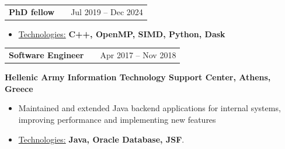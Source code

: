 \documentclass[a4paper,10pt]{article}
\makeatletter
\newenvironment{job}[2]
{
	\begin{tabularx}{\linewidth}{@{}l X r@{}}
		\small
		\textbf{#1} & \hfill &  #2 \\[3.75pt]
	\end{tabularx}
	\footnotesize
	\setlength{\parskip}{3pt} %
	\setlength{\parindent}{0pt} %
}
{
}
\makeatother
\begin{document}
\begin{job}{PhD fellow}{Jul 2019 – Dec 2024}
\begin{itemize}
\begin{itemize}
			\item \href{https://www.more2020.eu/}{MORE}: Management of Real-time Energy data. 
				
			\begin{itemize}
				\item Built parallel continuous evaluation module in Java for sliding-window aggregations, enabling low-latency energy analytics
				\item Implemented parallel versions of time-series analytics algorithms in Python using Dask to improve efficiency and scalability for large-scale data processing
			
			
			
			\end{itemize}
		\end{itemize}
		
		\vspace{-1\baselineskip}
		
		\item \underline{Technologies:} \textbf{C++, OpenMP, SIMD, Python, Dask}
		
	\end{itemize}
\end{job}

\vspace{-0.6\baselineskip}
\begin{job}{Software Engineer}{Apr 2017 – Nov 2018}
	\textbf{Hellenic Army Information Technology Support Center, Athens, Greece} 
	
	\begin{itemize}
		
		
		\item Maintained and extended Java backend applications for internal systems, improving performance and implementing new features
		
		\item \underline{Technologies:} \textbf{Java, Oracle Database, JSF}.
	\end{itemize}
	
\end{job}
\end{document}
